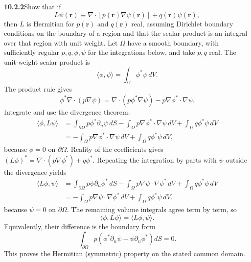 \par\bigskip
\noindent\textbf{10.2.2}\quad Show that if
\[
L\psi(\mathbf{r})\equiv
\nabla\cdot\left[p(\mathbf{r})\nabla\psi(\mathbf{r})\right]
+q(\mathbf{r})\psi(\mathbf{r}),
\]
then $L$ is Hermitian for $p(\mathbf{r})$ and $q(\mathbf{r})$ real, assuming
Dirichlet boundary conditions on the boundary of a region
 and that the scalar product is an
integral over that region with unit weight.
\solution
{}
Let $\Omega$ have a smooth boundary, with sufficiently regular
$p,q,\phi,\psi$ for the integrations below, and take $p,q$ real.
The unit-weight scalar product is
\[
\langle\phi,\psi\rangle=\int_\Omega\phi^*\psi\,dV.
\]
The product rule gives
\[
\phi^*\nabla\cdot(p\nabla\psi)
=\nabla\cdot(p\phi^*\nabla\psi)-p\nabla\phi^*\cdot\nabla\psi.
\]
Integrate and use the divergence theorem:
\begin{align*}
\langle\phi,L\psi\rangle
&=\int_{\partial\Omega}p\phi^*\partial_n\psi\,dS
-\int_\Omega p\nabla\phi^*\cdot\nabla\psi\,dV
+\int_\Omega q\phi^*\psi\,dV\\
&=-\int_\Omega p\nabla\phi^*\cdot\nabla\psi\,dV
+\int_\Omega q\phi^*\psi\,dV,
\end{align*}
because $\phi=0$ on $\partial\Omega$.
Reality of the coefficients gives
$(L\phi)^*=\nabla\cdot(p\nabla\phi^*)+q\phi^*$. Repeating the
integration by parts with $\psi$ outside the divergence yields
\begin{align*}
\langle L\phi,\psi\rangle
&=\int_{\partial\Omega}p\psi\partial_n\phi^*\,dS
-\int_\Omega p\nabla\psi\cdot\nabla\phi^*\,dV
+\int_\Omega q\phi^*\psi\,dV\\
&=-\int_\Omega p\nabla\psi\cdot\nabla\phi^*\,dV
+\int_\Omega q\phi^*\psi\,dV.
\end{align*}
because $\psi=0$ on $\partial\Omega$. The remaining volume integrals
agree term by term, so
\[
\boxed{\langle\phi,L\psi\rangle=\langle L\phi,\psi\rangle.}
\]
Equivalently, their difference is the boundary form
\[
\int_{\partial\Omega}p\left(\phi^*\partial_n\psi
-\psi\partial_n\phi^*\right)dS=0.
\]
This proves the Hermitian (symmetric) property on the stated common
domain. 


